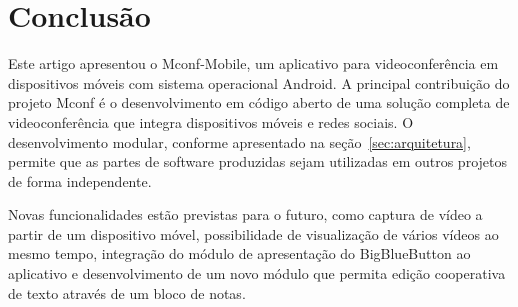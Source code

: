 \documentclass{acm_proc_article-sp}
\begin{document}

\section{Conclusão}

Este artigo apresentou o Mconf-Mobile, um aplicativo para videoconferência em dispositivos móveis com sistema operacional Android. A principal contribuição do projeto Mconf é o desenvolvimento em código aberto de uma solução completa de videoconferência que integra dispositivos móveis e redes sociais. O desenvolvimento modular, conforme apresentado na seção~\ref{sec:arquitetura}, permite que as partes de software produzidas sejam utilizadas em outros projetos de forma independente.

Novas funcionalidades estão previstas para o futuro, como captura de vídeo a partir de um dispositivo móvel, possibilidade de visualização de vários vídeos ao mesmo tempo, integração do módulo de apresentação do BigBlueButton ao aplicativo e desenvolvimento de um novo módulo que permita edição cooperativa de texto através de um bloco de notas. 

%

%
%
\balancecolumns
\end{document}
